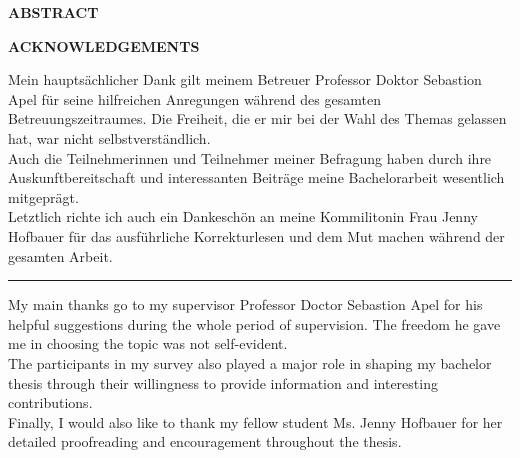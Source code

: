 

{
	\raggedbottom
	\centering
	\vspace{0.9cm}
	\large
	\textbf{ABSTRACT}
	
	\pagebreak

	\vspace{0.9cm}
	\large
	
	\textbf{\centering ACKNOWLEDGEMENTS}
	\vspace*{\fill}

	Mein hauptsächlicher Dank gilt meinem Betreuer Professor Doktor Sebastion Apel für seine hilfreichen Anregungen während des gesamten Betreuungszeitraumes. Die Freiheit, die er mir bei der Wahl des Themas gelassen hat, war nicht selbstverständlich.
	\newline \\
	Auch die Teilnehmerinnen und Teilnehmer meiner Befragung haben durch ihre Auskunftbereitschaft und interessanten Beiträge meine Bachelorarbeit wesentlich mitgeprägt.
	\newline \\
	Letztlich richte ich auch ein Dankeschön an meine Kommilitonin  Frau Jenny Hofbauer für das ausführliche Korrekturlesen und dem Mut machen während der gesamten Arbeit.
	
	\vspace{1cm}
	\noindent\hfil\rule{0.5\textwidth}{.4pt}\hfil
	\vspace{1cm}
	
	My main thanks go to my supervisor Professor Doctor Sebastion Apel for his helpful suggestions during the whole period of supervision. The freedom he gave me in choosing the topic was not self-evident.
	\newline \\
	The participants in my survey also played a major role in shaping my bachelor thesis through their willingness to provide information and interesting contributions.
	\newline \\
	Finally, I would also like to thank my fellow student Ms. Jenny Hofbauer for her detailed proofreading and encouragement throughout the thesis.
	\vspace*{\fill}
	\pagebreak


\par}